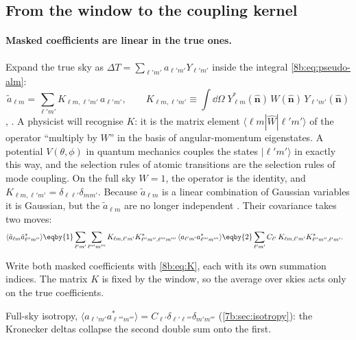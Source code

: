 \subsection{From the window to the coupling kernel}
\label{8b:sec:kernel}

\paragraph{Masked coefficients are linear in the true ones.}
Expand the true sky as $\Delta T=\sum_{\ell'm'}a_{\ell'm'}Y_{\ell'm'}$ inside the integral
\eqref{8b:eq:pseudo-alm}:
\begin{equation}
  \tilde a_{\ell m}=\sum_{\ell'm'}K_{\ell m,\ell'm'}\,a_{\ell'm'},\qquad
  K_{\ell m,\ell'm'}\equiv\int\dd\Omega\;Y^*_{\ell m}(\hat{\bm n})\,W(\hat{\bm n})\,Y_{\ell'm'}(\hat{\bm n})
  \label{8b:eq:K}
\end{equation}
, \cite[eqs~5a--6]{Efstathiou2004}. A physicist will recognise $K$:
it is the matrix element $\langle\ell m|\hat W|\ell'm'\rangle$ of the operator ``multiply by $W$'' in
the basis of angular-momentum eigenstates. A potential $V(\theta,\phi)$ in quantum mechanics
couples the states $|\ell'm'\rangle$ in exactly this way, and the selection rules of atomic
transitions are the selection rules of mode coupling. On the full sky $W=1$, the operator is the
identity, and $K_{\ell m,\ell'm'}=\delta_{\ell\ell'}\delta_{mm'}$. Because $\tilde a_{\ell m}$ is a linear combination of
Gaussian variables it is Gaussian, but the $\tilde a_{\ell m}$ are no longer independent
. Their covariance takes two moves:
\begin{align}
  \langle\tilde a_{\ell m}\tilde a^*_{\ell''m''}\rangle
  &\eqby{1}\sum_{\ell'm'}\sum_{\ell'''m'''}K_{\ell m,\ell'm'}K^*_{\ell''m'',\ell'''m'''}\,\langle a_{\ell'm'}a^*_{\ell'''m'''}\rangle
   \eqby{2}\sum_{\ell'm'}C_{\ell'}\,K_{\ell m,\ell'm'}K^*_{\ell''m'',\ell'm'} .
  \label{8b:eq:alm-cov}
\end{align}
\begin{explain}
  \item Write both masked coefficients with \eqref{8b:eq:K}, each with its own summation indices. The
        matrix $K$ is fixed by the window, so the average over skies acts only on the true coefficients.
  \item Full-sky isotropy, $\langle a_{\ell'm'}a^*_{\ell'''m'''}\rangle=C_{\ell'}\delta_{\ell'\ell'''}\delta_{m'm'''}$
        (\cref{7b:sec:isotropy}): the Kronecker deltas collapse the second double sum onto the first.
\end{explain}


